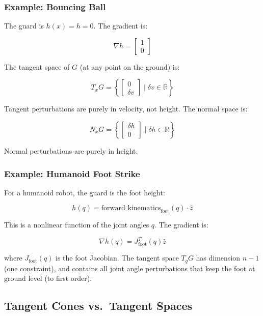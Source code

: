 \documentclass[
  letterpaper,
  DIV=11,
  numbers=noendperiod]{scrartcl}
\begin{document}
\subsubsection{Example: Bouncing Ball}\label{example-bouncing-ball-1}

The guard is \(h(x) = h = 0\). The gradient is:

\[
\nabla h = \begin{bmatrix} 1 \\ 0 \end{bmatrix}
\]

The tangent space of \(G\) (at any point on the ground) is:

\[
T_x G = \left\{ \begin{bmatrix} 0 \\ \delta v \end{bmatrix} \mid \delta v \in \mathbb{R} \right\}
\]

Tangent perturbations are purely in velocity, not height. The normal
space is:

\[
N_x G = \left\{ \begin{bmatrix} \delta h \\ 0 \end{bmatrix} \mid \delta h \in \mathbb{R} \right\}
\]

Normal perturbations are purely in height.

\subsubsection{Example: Humanoid Foot
Strike}\label{example-humanoid-foot-strike}

For a humanoid robot, the guard is the foot height:

\[
h(q) = \text{forward_kinematics}_{\text{foot}}(q) \cdot \hat{z}
\]

This is a nonlinear function of the joint angles \(q\). The gradient is:

\[
\nabla h(q) = J_{\text{foot}}^T(q) \hat{z}
\]

where \(J_{\text{foot}}(q)\) is the foot Jacobian. The tangent space
\(T_q G\) has dimension \(n-1\) (one constraint), and contains all joint
angle perturbations that keep the foot at ground level (to first order).

\subsection{Tangent Cones vs.~Tangent
Spaces}\label{tangent-cones-vs.-tangent-spaces}
\end{document}
